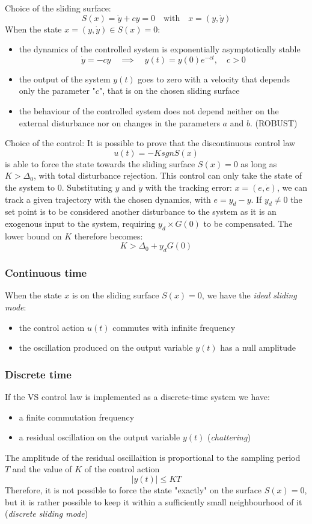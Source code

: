 \documentclass{book}
\begin{document}
Choice of the sliding surface:
\[
    S(x) = \dot{y} + cy = 0 \quad \text{with} \quad x=(y,\dot{y})
\]
When the state $x=(y,\dot{y})\in S(x)=0$:
\begin{itemize}
    \item the dynamics of the controlled system is exponentially asymptotically stable \[
            \dot{y} = -cy \quad \implies \quad y(t) = y(0)e^{-ct}, \quad c>0
    \]
    \item the output of the system $y(t)$ goes to zero with a velocity that depends only the parameter "$c$", that is on the chosen sliding surface
    \item the behaviour of the controlled system does not depend neither on the external disturbance nor on changes in the parameters $a$ and $b$. (ROBUST)
\end{itemize}

Choice of the control: It is possible to prove that the discontinuous control law
\[
    u(t) = -K sgn S(x)
\]
is able to force the state towards the sliding surface $S(x)=0$ as long as $K>\Delta_0$, with total disturbance rejection. This control can only take the state of the system to 0. Substituting $y$ and $\dot{y}$ with the tracking error: $x=(e,\dot{e})$, we can track a given trajectory with the chosen dynamics, with $e=y_d-y$. If $y_d\neq 0 $ the set point is to be considered another disturbance to the system as it is an exogenous input to the system, requiring $y_d \times G(0)$ to be compensated. The lower bound on $K$ therefore becomes:
\[
    K>\Delta_0+y_dG(0)
\]

\subsubsection{Continuous time}
When the state $x$ is on the sliding surface $S(x)=0$, we have the \emph{ideal sliding mode}: 
\begin{itemize}
    \item the control action $u(t)$ commutes with infinite frequency
    \item the oscillation produced on the output variable $y(t)$ has a null amplitude
\end{itemize}
\subsubsection{Discrete time}
If the VS control law is implemented as a discrete-time system we have:
\begin{itemize}
    \item a finite commutation frequency
    \item a residual oscillation on the output variable $y(t)$ (\emph{chattering})
\end{itemize}
The amplitude of the residual oscillaition is proportional to the sampling period $T$ and the value of $K$ of the control action
\[
    |y(t)|\leq KT
\]
Therefore, it is not possible to force the state "exactly" on the surface $S(x)=0$, but it is rather possible to keep it within a sufficiently small neighbourhood of it (\emph{discrete sliding mode})
\end{document}
